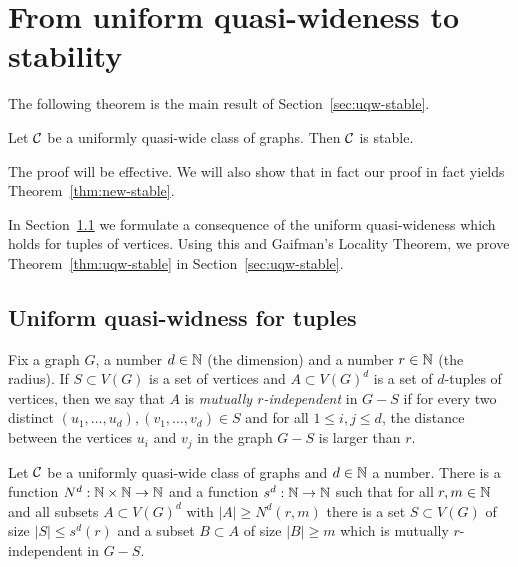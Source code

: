 
\section{From uniform quasi-wideness to stability}\label{sec:stable}
The following theorem is the main result of Section~\ref{sec:uqw-stable}.


\begin{theorem}\label{thm:uqw-stable}
	Let $\cal C$ be a uniformly quasi-wide class of graphs.
	Then $\cal C$ is stable. %
\end{theorem}
The proof will be effective. We will also show that in fact our  proof in fact yields Theorem~\ref{thm:new-stable}.


In Section~\ref{sec:uqw-tuples} we formulate a consequence of the uniform quasi-wideness which
holds for tuples of vertices. Using this and  Gaifman's Locality Theorem, we prove Theorem~\ref{thm:uqw-stable} in Section~\ref{sec:uqw-stable}.


\subsection{Uniform quasi-widness for tuples}\label{sec:uqw-tuples}
Fix a graph $G$, a number $d\in\N$ (the dimension) and a number $r\in \N$ (the radius).
If $S\subset V(G)$ is a set of vertices and $A\subset V(G)^d$ is a set of $d$-tuples of vertices,
then we say that $A$ is \emph{mutually $r$-independent} in $G-S$ 
if for every two distinct $(u_1,\ldots,u_d),(v_1,\ldots,v_d)\in S$
and for all $1\le i,j\le d$, the distance between the vertices $u_i$ and $v_j$ in the graph $G-S$
is larger than $r$.


\begin{proposition}\label{prop:uqw-tuples}
	Let $\cal C$ be a uniformly quasi-wide class of graphs and $d\in\N$ a number.
	There is a  function $N^d:\N\times\N\to\N$ and a function $s^d:\N\to\N$
	such that for all $r,m\in\N$ and all subsets $A\subset V(G)^d$
	with $|A|\ge N^d(r,m)$ there  is a set $S\subset V(G)$
	of size $|S|\le s^d(r)$ and a subset $B\subset A$ of size $|B|\ge m$ which is mutually $r$-independent in $G-S$.
\end{proposition}

